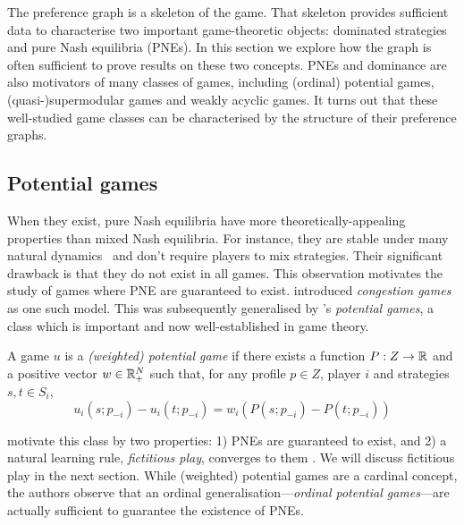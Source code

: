 \documentclass[preprint,authoryear]{elsarticle}
\begin{document}
The preference graph is a skeleton of the game. That skeleton provides sufficient data to characterise two important game-theoretic objects: dominated strategies and pure Nash equilibria (PNEs). In this section we explore how the graph is often sufficient to prove results on these two concepts. PNEs and dominance are also motivators of many classes of games, including (ordinal) potential games, (quasi-)supermodular games and weakly acyclic games. It turns out that these well-studied game classes can be characterised by the structure of their preference graphs.

\subsection{Potential games} \label{sec: potential}

When they exist, pure Nash equilibria have more theoretically-appealing properties than mixed Nash equilibria. For instance, they are stable under many natural dynamics~\citep{vlatakis-gkaragkounis_no-regret_2020} and don't require players to mix strategies. Their significant drawback is that they do not exist in all games. This observation motivates the study of games where PNE are guaranteed to exist. \citeauthor{rosenthal_class_1973} introduced \emph{congestion games} as one such model. This was subsequently generalised by \citeauthor{monderer_potential_1996}'s \emph{potential games}, a class which is important and now well-established in game theory.

\begin{defn}
    A game $u$ is a \emph{(weighted) potential game} if there exists a function $P: Z \to \mathbb{R}$ and a positive vector $w\in \mathbb{R}^N_+$ such that, for any profile $p\in Z$, player $i$ and strategies $s,t\in S_i$,
    \begin{equation}
        u_i(s; p_{-i}) - u_i(t;p_{-i}) = w_i(P(s; p_{-i}) - P(t;p_{-i}))
    \end{equation}
\end{defn}

\cite{monderer_potential_1996} motivate this class by two properties: 1) PNEs are guaranteed to exist, and 2) a natural learning rule, \emph{fictitious play}, converges to them \citep[proved in][]{monderer_fictitious_1996}. We will discuss fictitious play in the next section. While (weighted) potential games are a cardinal concept, the authors observe that an ordinal generalisation---\emph{ordinal potential games}---are actually sufficient to guarantee the existence of PNEs. 
\end{document}
